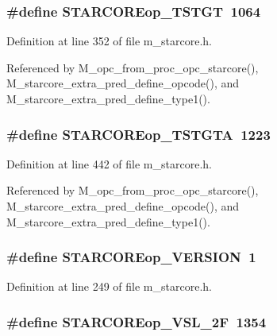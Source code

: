 \subsubsection{\setlength{\rightskip}{0pt plus 5cm}\#define STARCOREop\_\-TSTGT~1064}\label{m__starcore_8h_ddbf013282b0d2e5474e991d9096f527}




Definition at line 352 of file m\_\-starcore.h.

Referenced by M\_\-opc\_\-from\_\-proc\_\-opc\_\-starcore(), M\_\-starcore\_\-extra\_\-pred\_\-define\_\-opcode(), and M\_\-starcore\_\-extra\_\-pred\_\-define\_\-type1().
\subsubsection{\setlength{\rightskip}{0pt plus 5cm}\#define STARCOREop\_\-TSTGTA~1223}\label{m__starcore_8h_b90abac7ad0d45862119ee8ff7904864}




Definition at line 442 of file m\_\-starcore.h.

Referenced by M\_\-opc\_\-from\_\-proc\_\-opc\_\-starcore(), M\_\-starcore\_\-extra\_\-pred\_\-define\_\-opcode(), and M\_\-starcore\_\-extra\_\-pred\_\-define\_\-type1().
\subsubsection{\setlength{\rightskip}{0pt plus 5cm}\#define STARCOREop\_\-VERSION~1}\label{m__starcore_8h_8e013f78f68486248398cfd87af2ed02}




Definition at line 249 of file m\_\-starcore.h.
\subsubsection{\setlength{\rightskip}{0pt plus 5cm}\#define STARCOREop\_\-VSL\_\-2F~1354}\label{m__starcore_8h_94e0505cc625cca42f8c8f086020e3c4}




